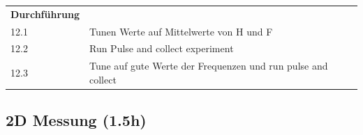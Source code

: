     \vspace{1cm}




\begin{tabular}{ll}

    \textbf{Durchführung} & \\

    12.1 & Tunen Werte auf Mittelwerte von H und F \\

    12.2 & Run Pulse and collect experiment \\

    12.3 & Tune auf gute Werte der Frequenzen und run pulse and collect\\

\end{tabular}  

\subsection{2D Messung (1.5h)}


